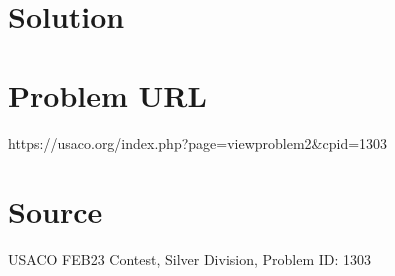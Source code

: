 \documentclass[12pt]{article}
\begin{document}
\section*{Solution}


\section*{Problem URL}
https://usaco.org/index.php?page=viewproblem2&cpid=1303

\section*{Source}
USACO FEB23 Contest, Silver Division, Problem ID: 1303
\end{document}
